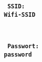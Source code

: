 \documentclass[a4paper]{scrartcl}
\begin{document}
\thispagestyle{empty}

\begin{center}
  {\fontsize{50}{84}\texttt{\textbf{ SSID:}}\\[5mm] 
  \fontsize{65}{84}\texttt{\textbf{Wifi-SSID}}}\\[1cm]  %
  \item {}\\[20mm]
  \item \fontsize{50}{84}\texttt{\textbf{ Passwort:}}\\[5mm]
  \fontsize{57}{84}\texttt{\textbf{password}}\\[20mm]
\end{center}
\end{document}
